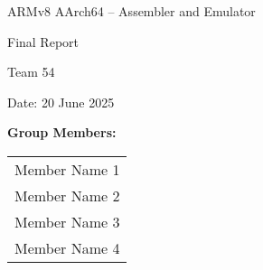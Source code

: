 \documentclass[11pt]{article}
\begin{document}
\begin{titlepage}
    \centering
    \vspace*{2cm}
    
    {\huge ARMv8 AArch64 – Assembler and Emulator\par}
    
    \vspace{1.5cm}
    
    {\LARGE Final Report\par}
    
    \vspace{0.5cm}
    
    
    \vfill %
    
    {\Large Team 54\par}
    
    \vspace{1cm}
    
    {\large Date: 20 June 2025\par}
    
    \vspace{1cm}
    
    \textbf{Group Members:}\\
    \begin{large}
        \begin{tabular}{l}
            Member Name 1 \\
            Member Name 2 \\
            Member Name 3 \\
            Member Name 4 \\
        \end{tabular}
    \end{large}

    \vspace*{2cm}
    
\end{titlepage}

\tableofcontents
\newpage

\end{document}
